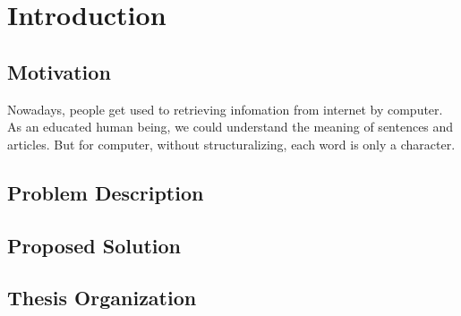 \chapter{Introduction}

\section{Motivation}
Nowadays, people get used to retrieving infomation from internet by computer. As an educated human being, we could understand the meaning of sentences and articles. But for computer, without structuralizing, each word is only a character.

\section{Problem Description}

\section{Proposed Solution}

\section{Thesis Organization}

